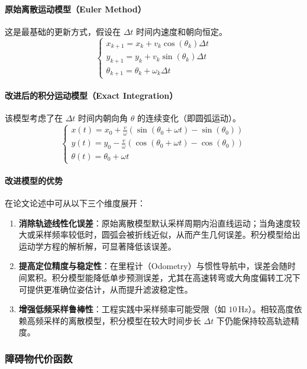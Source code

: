\paragraph{原始离散运动模型（Euler Method）}
这是最基础的更新方式，假设在 $\Delta t$ 时间内速度和朝向恒定。
\begin{equation}
\begin{cases}
x_{k+1} = x_k + v_k \cos(\theta_k) \Delta t \\
y_{k+1} = y_k + v_k \sin(\theta_k) \Delta t \\
\theta_{k+1} = \theta_k + \omega_k \Delta t
\end{cases}
\end{equation}

\paragraph{改进后的积分运动模型（Exact Integration）}
该模型考虑了在 $\Delta t$ 时间内朝向角 $\theta$ 的连续变化（即圆弧运动）。
\begin{equation}
\begin{cases}
x(t) = x_0 + \frac{v}{\omega}(\sin(\theta_0 + \omega t) - \sin(\theta_0)) \\
y(t) = y_0 - \frac{v}{\omega}(\cos(\theta_0 + \omega t) - \cos(\theta_0)) \\
\theta(t) = \theta_0 + \omega t
\end{cases}
\end{equation}
\paragraph{改进模型的优势}
在论文论述中可从以下三个维度展开：
\begin{enumerate}
    \item \textbf{消除轨迹线性化误差}：原始离散模型默认采样周期内沿直线运动；当角速度较大或采样频率较低时，圆弧会被折线近似，从而产生几何误差。积分模型给出运动学方程的解析解，可显著降低该误差。
    \item \textbf{提高定位精度与稳定性}：在里程计（Odometry）与惯性导航中，误差会随时间累积。积分模型能降低单步预测误差，尤其在高速转弯或大角度偏转工况下可提供更准确位姿估计，从而提升滤波稳定性。
    \item \textbf{增强低频采样鲁棒性}：工程实践中采样频率可能受限（如 $10\,\mathrm{Hz}$）。相较高度依赖高频采样的离散模型，积分模型在较大时间步长 $\Delta t$ 下仍能保持较高轨迹精度。
\end{enumerate}

\subsubsection{障碍物代价函数}
